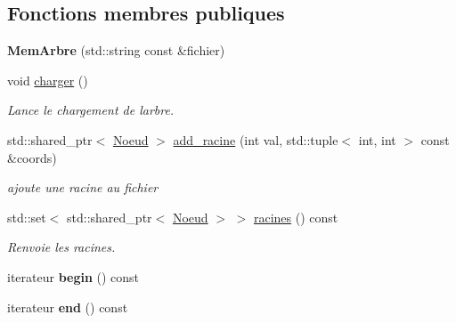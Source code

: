 \subsection*{Fonctions membres publiques}
\begin{DoxyCompactItemize}
\item 
{\bfseries Mem\+Arbre} (std\+::string const \&fichier)\hypertarget{classMemArbre_ac5190591ba7c14a65a0c4dac3b79dfd7}{}\label{classMemArbre_ac5190591ba7c14a65a0c4dac3b79dfd7}

\item 
void \hyperlink{classMemArbre_aed29ba0b60d2b1000df67bcc8c20017f}{charger} ()\hypertarget{classMemArbre_aed29ba0b60d2b1000df67bcc8c20017f}{}\label{classMemArbre_aed29ba0b60d2b1000df67bcc8c20017f}

\begin{DoxyCompactList}\small\item\em Lance le chargement de l\textquotesingle{}arbre. \end{DoxyCompactList}\item 
std\+::shared\+\_\+ptr$<$ \hyperlink{classMemArbre_1_1Noeud}{Noeud} $>$ \hyperlink{classMemArbre_ac18d57ffee484bf225255213ba5b0cbe}{add\+\_\+racine} (int val, std\+::tuple$<$ int, int $>$ const \&coords)\hypertarget{classMemArbre_ac18d57ffee484bf225255213ba5b0cbe}{}\label{classMemArbre_ac18d57ffee484bf225255213ba5b0cbe}

\begin{DoxyCompactList}\small\item\em ajoute une racine au fichier \end{DoxyCompactList}\item 
std\+::set$<$ std\+::shared\+\_\+ptr$<$ \hyperlink{classMemArbre_1_1Noeud}{Noeud} $>$ $>$ \hyperlink{classMemArbre_a5e84dc402d7e740f853cef4107f7cce4}{racines} () const \hypertarget{classMemArbre_a5e84dc402d7e740f853cef4107f7cce4}{}\label{classMemArbre_a5e84dc402d7e740f853cef4107f7cce4}

\begin{DoxyCompactList}\small\item\em Renvoie les racines. \end{DoxyCompactList}\item 
iterateur {\bfseries begin} () const \hypertarget{classMemArbre_afd69fc6c9f2fe86ac9dea7e4ca4223e0}{}\label{classMemArbre_afd69fc6c9f2fe86ac9dea7e4ca4223e0}

\item 
iterateur {\bfseries end} () const \hypertarget{classMemArbre_a87f7bbf0ea68be14aa83661585bcf4a8}{}\label{classMemArbre_a87f7bbf0ea68be14aa83661585bcf4a8}


\end{DoxyCompactItemize}
